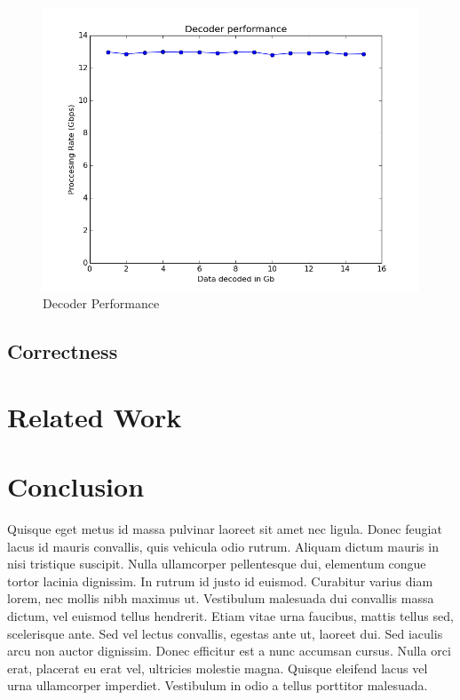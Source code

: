\documentclass[conference]{IEEEtran}
\begin{document}
\begin{figure}[h!]
  \centering
  \includegraphics[scale=0.50]{decoder_figure}
  \caption{Decoder Performance}
  \label{fig:decoder_performance}
\end{figure}

\subsection{Correctness}

\section{Related Work}

\section{Conclusion}

Quisque eget metus id massa pulvinar laoreet sit amet nec ligula. Donec feugiat lacus id mauris convallis, quis vehicula odio rutrum. Aliquam dictum mauris in nisi tristique suscipit. Nulla ullamcorper pellentesque dui, elementum congue tortor lacinia dignissim. In rutrum id justo id euismod. Curabitur varius diam lorem, nec mollis nibh maximus ut. Vestibulum malesuada dui convallis massa dictum, vel euismod tellus hendrerit. Etiam vitae urna faucibus, mattis tellus sed, scelerisque ante. Sed vel lectus convallis, egestas ante ut, laoreet dui. Sed iaculis arcu non auctor dignissim. Donec efficitur est a nunc accumsan cursus. Nulla orci erat, placerat eu erat vel, ultricies molestie magna. Quisque eleifend lacus vel urna ullamcorper imperdiet. Vestibulum in odio a tellus porttitor malesuada.



\end{document}

